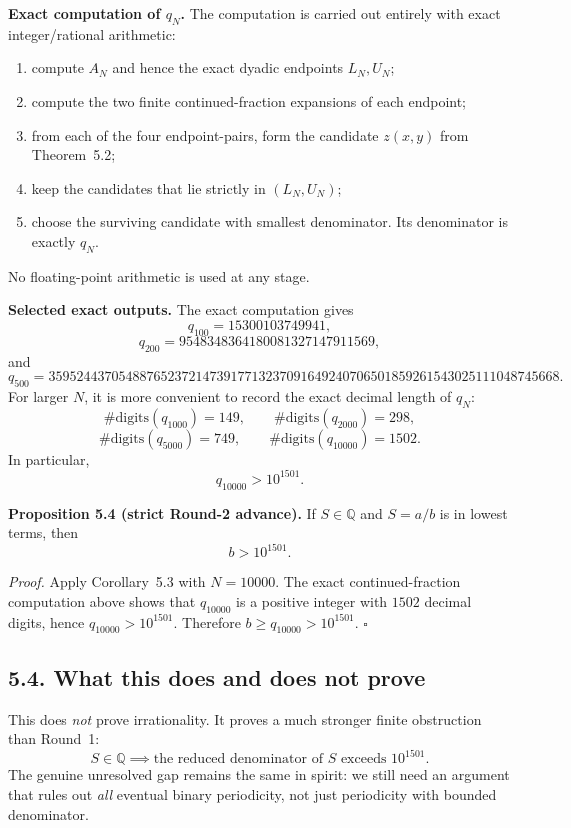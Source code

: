 \medskip
\noindent\textbf{Exact computation of $q_N$.}
The computation is carried out entirely with exact integer/rational arithmetic:
\begin{enumerate}
\item compute $A_N$ and hence the exact dyadic endpoints $L_N,U_N$;
\item compute the two finite continued-fraction expansions of each endpoint;
\item from each of the four endpoint-pairs, form the candidate $z(x,y)$ from Theorem~5.2;
\item keep the candidates that lie strictly in $(L_N,U_N)$;
\item choose the surviving candidate with smallest denominator. Its denominator is exactly $q_N$.
\end{enumerate}
No floating-point arithmetic is used at any stage.

\medskip
\noindent\textbf{Selected exact outputs.}
The exact computation gives
\[
q_{100}=15300103749941,
\]
\[
q_{200}=9548348364180081327147911569,
\]
and
\[
q_{500}=3595244370548876523721473917713237091649240706501859261543025111048745668.
\]
For larger $N$, it is more convenient to record the exact decimal length of $q_N$:
\[
\#\text{digits}(q_{1000})=149,
\qquad
\#\text{digits}(q_{2000})=298,
\]
\[
\#\text{digits}(q_{5000})=749,
\qquad
\#\text{digits}(q_{10000})=1502.
\]
In particular,
\[
q_{10000}>10^{1501}.
\]

\medskip
\noindent\textbf{Proposition 5.4 (strict Round-2 advance).}
If $S\in\mathbb Q$ and $S=a/b$ is in lowest terms, then
\[
b>10^{1501}.
\]

\emph{Proof.}
Apply Corollary~5.3 with $N=10000$. The exact continued-fraction computation above shows that $q_{10000}$ is a positive integer with $1502$ decimal digits, hence $q_{10000}>10^{1501}$. Therefore $b\ge q_{10000}>10^{1501}$. \hfill$\square$

\subsection*{5.4. What this does and does not prove}

This does \emph{not} prove irrationality. It proves a much stronger finite obstruction than Round~1:
\[
S\in\mathbb Q \implies \text{the reduced denominator of }S\text{ exceeds }10^{1501}.
\]
The genuine unresolved gap remains the same in spirit: we still need an argument that rules out \emph{all} eventual binary periodicity, not just periodicity with bounded denominator.

